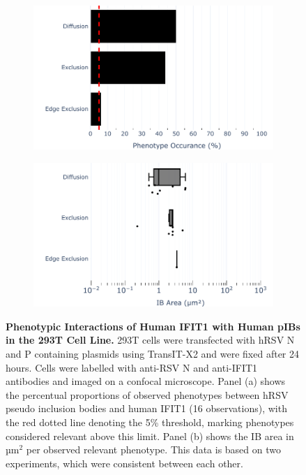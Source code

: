 \begin{figure}
    \begin{subfigure}{0.495\textwidth}
        \caption{}
        \includegraphics[width=1\linewidth]{09. Chapter 4/Figs/01. pIB/02. IFIT1/01. bar_i1_293t.pdf} 
    \end{subfigure}
    \begin{subfigure}{0.495\textwidth}
        \caption{}
        \includegraphics[width=1\linewidth]{09. Chapter 4/Figs/01. pIB/02. IFIT1/02. box_i1_293t.pdf}
    \end{subfigure}
    \caption[Phenotypic Interactions of Human IFIT1 with Human pIBs in the 293T Cell Line.]{\textbf{Phenotypic Interactions of Human IFIT1 with Human pIBs in the 293T Cell Line.} 293T cells were transfected with hRSV N and P containing plasmids using TransIT-X2 and were fixed after 24 hours. Cells were labelled with anti-RSV N and anti-IFIT1 antibodies and imaged on a confocal microscope. Panel (a) shows the percentual proportions of observed phenotypes between hRSV pseudo inclusion bodies and human IFIT1 (16 observations), with the red dotted line denoting the 5\% threshold, marking phenotypes considered relevant above this limit. Panel (b) shows the IB area in \(\mbox{µm}^2\) per observed relevant phenotype. This data is based on two experiments, which were consistent between each other.}
    \label{fig:Phenotypic Interactions of Human IFIT1 with Human pIBs in the 293T Cell Line}
\end{figure}

